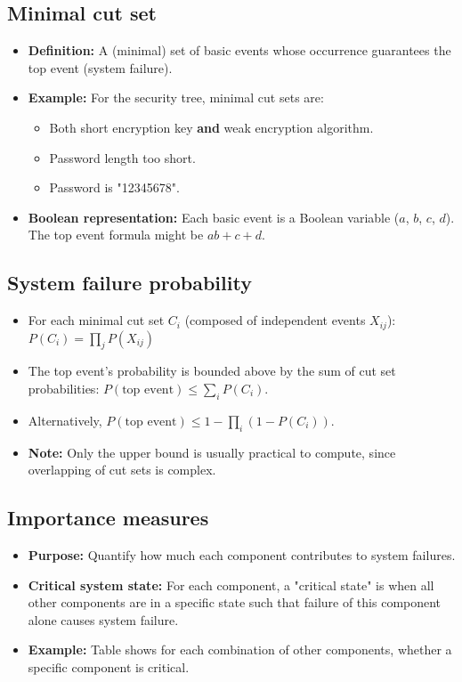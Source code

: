 \documentclass[11pt,a4paper]{article}
\begin{document}
\subsection*{Minimal cut set}
\begin{itemize}
    \item \textbf{Definition:} A (minimal) set of basic events whose occurrence guarantees the top event (system failure).
    \item \textbf{Example:} For the security tree, minimal cut sets are: 
        \begin{itemize}
            \item Both short encryption key \textbf{and} weak encryption algorithm.
            \item Password length too short.
            \item Password is "12345678".
        \end{itemize}
    \item \textbf{Boolean representation:} Each basic event is a Boolean variable ($a$, $b$, $c$, $d$). The top event formula might be $ab + c + d$.
\end{itemize}

\subsection*{System failure probability}
\begin{itemize}
    \item For each minimal cut set $C_i$ (composed of independent events $X_{ij}$): $P(C_i) = \prod_{j} P(X_{ij})$
    \item The top event's probability is bounded above by the sum of cut set probabilities: $P(\text{top event}) \leq \sum_i P(C_i)$.
    \item Alternatively, $P(\text{top event}) \leq 1 - \prod_i (1-P(C_i))$.
    \item \textbf{Note:} Only the upper bound is usually practical to compute, since overlapping of cut sets is complex.
\end{itemize}

\subsection*{Importance measures}
\begin{itemize}
    \item \textbf{Purpose:} Quantify how much each component contributes to system failures.
    \item \textbf{Critical system state:} For each component, a "critical state" is when all other components are in a specific state such that failure of this component alone causes system failure.
    \item \textbf{Example:} Table shows for each combination of other components, whether a specific component is critical.
\end{itemize}
\end{document}
